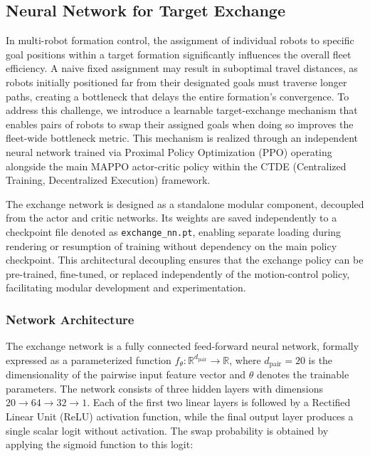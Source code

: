 
\subsection{Neural Network for Target Exchange}

In multi-robot formation control, the assignment of individual robots to specific goal positions within a target formation significantly influences the overall fleet efficiency. A naive fixed assignment may result in suboptimal travel distances, as robots initially positioned far from their designated goals must traverse longer paths, creating a bottleneck that delays the entire formation's convergence. To address this challenge, we introduce a learnable target-exchange mechanism that enables pairs of robots to swap their assigned goals when doing so improves the fleet-wide bottleneck metric. This mechanism is realized through an independent neural network trained via Proximal Policy Optimization (PPO) operating alongside the main MAPPO actor-critic policy within the CTDE (Centralized Training, Decentralized Execution) framework.

The exchange network is designed as a standalone modular component, decoupled from the actor and critic networks. Its weights are saved independently to a checkpoint file denoted as \texttt{exchange\_nn.pt}, enabling separate loading during rendering or resumption of training without dependency on the main policy checkpoint. This architectural decoupling ensures that the exchange policy can be pre-trained, fine-tuned, or replaced independently of the motion-control policy, facilitating modular development and experimentation.

\subsubsection{Network Architecture}

The exchange network is a fully connected feed-forward neural network, formally expressed as a parameterized function $f_{\theta}: \mathbb{R}^{d_{\text{pair}}} \rightarrow \mathbb{R}$, where $d_{\text{pair}} = 20$ is the dimensionality of the pairwise input feature vector and $\theta$ denotes the trainable parameters. The network consists of three hidden layers with dimensions $20 \rightarrow 64 \rightarrow 32 \rightarrow 1$. Each of the first two linear layers is followed by a Rectified Linear Unit (ReLU) activation function, while the final output layer produces a single scalar logit without activation. The swap probability is obtained by applying the sigmoid function to this logit:


